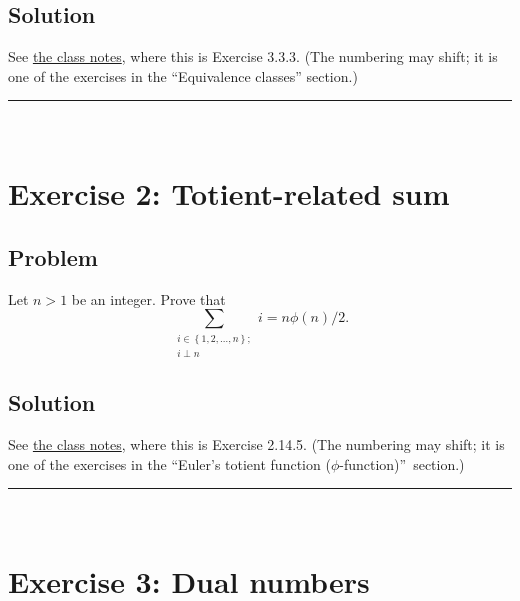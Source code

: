 \documentclass[paper=a4, fontsize=12pt]{scrartcl}%
\let\sumnonlimits\sum
\renewcommand{\sum}{\sumnonlimits\limits}
\theoremstyle{plainsl}
\theoremstyle{definition}
\theoremstyle{remark}
\begin{document}
\subsection{Solution}

See \href{http://www-users.math.umn.edu/~dgrinber/19s/notes.pdf}{the class
notes}, where this is Exercise 3.3.3. (The numbering may shift; it is one of
the exercises in the ``Equivalence classes'' section.)

\rule{\linewidth}{0.3pt} \\[0.4cm]

\section{Exercise 2: Totient-related sum}

\subsection{Problem}

Let $n > 1$ be an integer. Prove that
\[
\sum_{\substack{i \in\left\{  1, 2, \ldots, n \right\}  ; \\i \perp n}} i = n
\phi\left(  n \right)  / 2 .
\]


\subsection{Solution}

See \href{http://www-users.math.umn.edu/~dgrinber/19s/notes.pdf}{the class
notes}, where this is Exercise 2.14.5. (The numbering may shift; it is one of
the exercises in the \textquotedblleft Euler's totient function ($\phi
$-function)\textquotedblright\ section.)



\rule{\linewidth}{0.3pt} \\[0.4cm]

\section{Exercise 3: Dual numbers}
\end{document}
